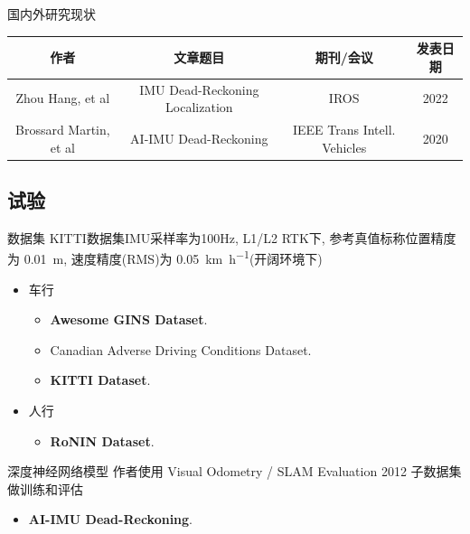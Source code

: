 \documentclass{beamer} %
\begin{document}
\begin{frame}{国内外研究现状}
    
    \begin{table}
    \tiny
        \begin{tabular}{cccc}
            \toprule
            作者 & 文章题目 & 期刊/会议 & 发表日期 \\
            \midrule
            Zhou Hang, et al & IMU Dead-Reckoning Localization\cite{zhou2022imu} & IROS & 2022 \\
            Brossard Martin, et al & AI-IMU Dead-Reckoning\cite{brossard2020ai} & IEEE Trans Intell. Vehicles & 2020 \\
            \bottomrule
        \end{tabular}
    \end{table}
\end{frame}

\subsection{试验}

\begin{frame}{数据集}
    KITTI数据集IMU采样率为100Hz, L1/L2 RTK下, 参考真值标称位置精度为 \qty{0.01}{\meter}, 速度精度(RMS)为 \qty{0.05}{\km\per\hour}(开阔环境下)
    \begin{itemize}
        \item 车行
        \begin{itemize}
            \item \textbf{Awesome GINS Dataset}\cite{Tang2022}.
            \item Canadian Adverse Driving Conditions Dataset\cite{pitropov2021canadian}.
            \item \textbf{KITTI Dataset}\cite{Geiger2013IJRR}.
        \end{itemize}
        \item 人行
        \begin{itemize}
            \item \textbf{RoNIN Dataset}\cite{herath2020ronin}.
        \end{itemize}   
    \end{itemize}
\end{frame}

\begin{frame}{深度神经网络模型}
    作者使用 Visual Odometry / SLAM Evaluation 2012 子数据集做训练和评估
    \begin{itemize}
        \item \textbf{AI-IMU Dead-Reckoning}\cite{brossard2020ai}.
    \end{itemize}
\end{frame}
\end{document}
